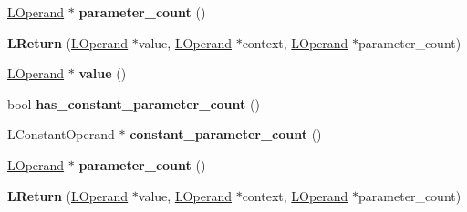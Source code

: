 \begin{DoxyCompactItemize}
\item 
\hyperlink{classv8_1_1internal_1_1_l_operand}{L\+Operand} $\ast$ {\bfseries parameter\+\_\+count} ()\hypertarget{classv8_1_1internal_1_1_l_return_ad644e156a714136b62e763b8239f04fc}{}\label{classv8_1_1internal_1_1_l_return_ad644e156a714136b62e763b8239f04fc}

\item 
{\bfseries L\+Return} (\hyperlink{classv8_1_1internal_1_1_l_operand}{L\+Operand} $\ast$value, \hyperlink{classv8_1_1internal_1_1_l_operand}{L\+Operand} $\ast$context, \hyperlink{classv8_1_1internal_1_1_l_operand}{L\+Operand} $\ast$parameter\+\_\+count)\hypertarget{classv8_1_1internal_1_1_l_return_af69be24dc79385d85a6b221138258d67}{}\label{classv8_1_1internal_1_1_l_return_af69be24dc79385d85a6b221138258d67}

\item 
\hyperlink{classv8_1_1internal_1_1_l_operand}{L\+Operand} $\ast$ {\bfseries value} ()\hypertarget{classv8_1_1internal_1_1_l_return_a846c6b559bdc3e68ab7de2472718eff0}{}\label{classv8_1_1internal_1_1_l_return_a846c6b559bdc3e68ab7de2472718eff0}

\item 
bool {\bfseries has\+\_\+constant\+\_\+parameter\+\_\+count} ()\hypertarget{classv8_1_1internal_1_1_l_return_a263e1bd29a12702e4c5fc6214fbe4ca5}{}\label{classv8_1_1internal_1_1_l_return_a263e1bd29a12702e4c5fc6214fbe4ca5}

\item 
L\+Constant\+Operand $\ast$ {\bfseries constant\+\_\+parameter\+\_\+count} ()\hypertarget{classv8_1_1internal_1_1_l_return_a0453fde1ccafc982160182465d2f2e4a}{}\label{classv8_1_1internal_1_1_l_return_a0453fde1ccafc982160182465d2f2e4a}

\item 
\hyperlink{classv8_1_1internal_1_1_l_operand}{L\+Operand} $\ast$ {\bfseries parameter\+\_\+count} ()\hypertarget{classv8_1_1internal_1_1_l_return_ad644e156a714136b62e763b8239f04fc}{}\label{classv8_1_1internal_1_1_l_return_ad644e156a714136b62e763b8239f04fc}

\item 
{\bfseries L\+Return} (\hyperlink{classv8_1_1internal_1_1_l_operand}{L\+Operand} $\ast$value, \hyperlink{classv8_1_1internal_1_1_l_operand}{L\+Operand} $\ast$context, \hyperlink{classv8_1_1internal_1_1_l_operand}{L\+Operand} $\ast$parameter\+\_\+count)\hypertarget{classv8_1_1internal_1_1_l_return_af69be24dc79385d85a6b221138258d67}{}\label{classv8_1_1internal_1_1_l_return_af69be24dc79385d85a6b221138258d67}


\end{DoxyCompactItemize}
